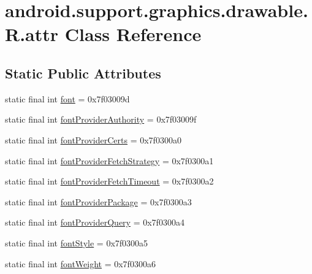 \hypertarget{classandroid_1_1support_1_1graphics_1_1drawable_1_1_r_1_1attr}{}\section{android.\+support.\+graphics.\+drawable.\+R.\+attr Class Reference}
\label{classandroid_1_1support_1_1graphics_1_1drawable_1_1_r_1_1attr}
\subsection*{Static Public Attributes}
\begin{DoxyCompactItemize}
\item 
static final int \mbox{\hyperlink{classandroid_1_1support_1_1graphics_1_1drawable_1_1_r_1_1attr_a9a73a48a0e780ef66ff0ce470452bcb7}{font}} = 0x7f03009d
\item 
static final int \mbox{\hyperlink{classandroid_1_1support_1_1graphics_1_1drawable_1_1_r_1_1attr_a284d857f2e796a2591c81df32c9fae71}{font\+Provider\+Authority}} = 0x7f03009f
\item 
static final int \mbox{\hyperlink{classandroid_1_1support_1_1graphics_1_1drawable_1_1_r_1_1attr_aa0c69e3aa8a365bf9fb2a0411a25cd0a}{font\+Provider\+Certs}} = 0x7f0300a0
\item 
static final int \mbox{\hyperlink{classandroid_1_1support_1_1graphics_1_1drawable_1_1_r_1_1attr_afd1e49d533e0a73a1d585ea07befae36}{font\+Provider\+Fetch\+Strategy}} = 0x7f0300a1
\item 
static final int \mbox{\hyperlink{classandroid_1_1support_1_1graphics_1_1drawable_1_1_r_1_1attr_a38eede4e9129d5b20dc7be4577f85d35}{font\+Provider\+Fetch\+Timeout}} = 0x7f0300a2
\item 
static final int \mbox{\hyperlink{classandroid_1_1support_1_1graphics_1_1drawable_1_1_r_1_1attr_abde581ac77bee7832d90b50d2ab7eff8}{font\+Provider\+Package}} = 0x7f0300a3
\item 
static final int \mbox{\hyperlink{classandroid_1_1support_1_1graphics_1_1drawable_1_1_r_1_1attr_af8dd2126a6a5003badc250c7739debde}{font\+Provider\+Query}} = 0x7f0300a4
\item 
static final int \mbox{\hyperlink{classandroid_1_1support_1_1graphics_1_1drawable_1_1_r_1_1attr_ad72fb19ea3a01321edbb9f8ab4e3d4cc}{font\+Style}} = 0x7f0300a5
\item 
static final int \mbox{\hyperlink{classandroid_1_1support_1_1graphics_1_1drawable_1_1_r_1_1attr_ae2c7f9b69aeb5af599fc6de1ba4fbf7c}{font\+Weight}} = 0x7f0300a6
\end{DoxyCompactItemize}
